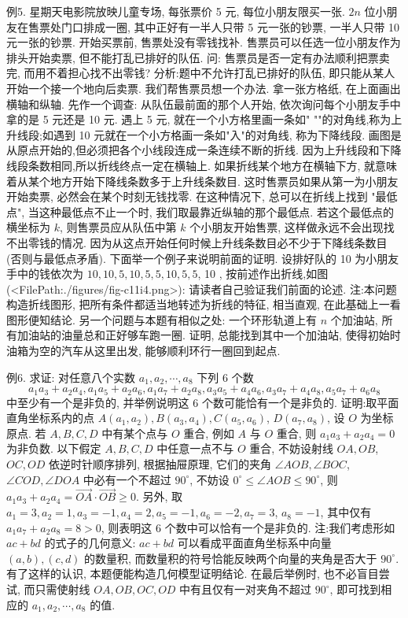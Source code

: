例5. 星期天电影院放映儿童专场, 每张票价 5 元, 每位小朋友限买一张.
$2 n$ 位小朋友在售票处门口排成一圈, 其中正好有一半人只带 5 元一张的钞票, 一半人只带 10 元一张的钞票.
开始买票前, 售票处没有零钱找补.
售票员可以任选一位小朋友作为排头开始卖票, 但不能打乱已排好的队伍.
问: 售票员是否一定有办法顺利把票卖完, 而用不着担心找不出零钱?
分析:题中不允许打乱已排好的队伍, 即只能从某人开始一个接一个地向后卖票.
我们帮售票员想一个办法.
拿一张方格纸, 在上面画出横轴和纵轴.
先作一个调查: 从队伍最前面的那个人开始, 依次询问每个小朋友手中拿的是 5 元还是 10 元.
遇上 5 元, 就在一个小方格里画一条如" ""的对角线,称为上升线段;如遇到 10 元就在一个小方格画一条如"入"的对角线, 称为下降线段.
画图是从原点开始的,但必须把各个小线段连成一条连续不断的折线.
因为上升线段和下降线段条数相同,所以折线终点一定在横轴上.
如果折线某个地方在横轴下方, 就意味着从某个地方开始下降线条数多于上升线条数目.
这时售票员如果从第一为小朋友开始卖票, 必然会在某个时刻无钱找零.
在这种情况下, 总可以在折线上找到 "最低点", 当这种最低点不止一个时, 我们取最靠近纵轴的那个最低点.
若这个最低点的横坐标为 $k$, 则售票员应从队伍中第 $k$ 个小朋友开始售票, 这样做永远不会出现找不出零钱的情况.
因为从这点开始任何时候上升线条数目必不少于下降线条数目 (否则与最低点矛盾).
下面举一个例子来说明前面的证明.
设排好队的 10 为小朋友手中的钱依次为 $10,10,5,10,5,5,10,5,5$, 10 , 按前述作出折线,如图(<FilePath:./figures/fig-c11i4.png>):
请读者自己验证我们前面的论述.
注:本问题构造折线图形, 把所有条件都适当地转述为折线的特征, 相当直观, 在此基础上一看图形便知结论.
另一个问题与本题有相似之处:
一个环形轨道上有 $n$ 个加油站, 所有加油站的油量总和正好够车跑一圈.
证明, 总能找到其中一个加油站, 使得初始时油箱为空的汽车从这里出发, 能够顺利环行一圈回到起点.



例6. 求证: 对任意八个实数 $a_1, a_2, \cdots, a_8$ 下列 6 个数
$$
a_1 a_3+a_2 a_4, a_1 a_5+a_2 a_6, a_1 a_7+a_2 a_8, a_3 a_5+a_4 a_6, a_3 a_7+a_4 a_8, a_5 a_7+a_6 a_8
$$
中至少有一个是非负的, 并举例说明这 6 个数可能恰有一个是非负的.
证明:取平面直角坐标系内的点 $A\left(a_1, a_2\right), B\left(a_3, a_4\right), C\left(a_5, a_6\right)$, $D\left(a_7, a_8\right)$, 设 $O$ 为坐标原点.
若 $A, B, C, D$ 中有某个点与 $O$ 重合, 例如 $A$ 与 $O$ 重合, 则 $a_1 a_3+ a_2 a_4=0$ 为非负数.
以下假定 $A, B, C, D$ 中任意一点不与 $O$ 重合, 不妨设射线 $O A, O B$, $O C, O D$ 依逆时针顺序排列, 根据抽屉原理, 它们的夹角 $\angle A O B, \angle B O C$, $\angle C O D, \angle D O A$ 中必有一个不超过 $90^{\circ}$, 不妨设 $0^{\circ} \leqslant \angle A O B \leqslant 90^{\circ}$, 则 $a_1 a_3+ a_2 a_4=\overrightarrow{O A} \cdot \overrightarrow{O B} \geqslant 0$.
另外, 取 $a_1=3, a_2=1, a_3=-1, a_4=2, a_5=-1, a_6=-2, a_7=3$, $a_8=-1$, 其中仅有 $a_1 a_7+a_2 a_8=8>0$, 则表明这 6 个数中可以恰有一个是非负的.
注:我们考虑形如 $a c+b d$ 的式子的几何意义: $a c+b d$ 可以看成平面直角坐标系中向量 $(a, b),(c, d)$ 的数量积, 而数量积的符号恰能反映两个向量的夹角是否大于 $90^{\circ}$. 有了这样的认识, 本题便能构造几何模型证明结论.
在最后举例时, 也不必盲目尝试, 而只需使射线 $O A, O B, O C, O D$ 中有且仅有一对夹角不超过 $90^{\circ}$, 即可找到相应的 $a_1, a_2, \cdots, a_8$ 的值.




